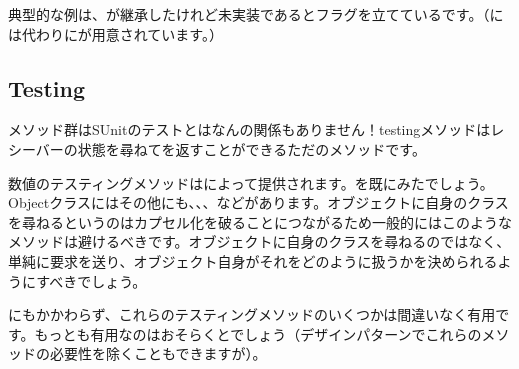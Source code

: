 \documentclass[a4paper,10pt,twoside]{book}
\begin{document}
典型的な例は、が継承したけれど未実装であるとフラグを立てているです。（には代わりにが用意されています。）



\subsection{Testing}

メソッド群はSUnitのテストとはなんの関係もありません！testingメソッドはレシーバーの状態を尋ねてを返すことができるただのメソッドです。

数値のテスティングメソッドはによって提供されます。を既にみたでしょう。Objectクラスにはその他にも、、、などがあります。オブジェクトに自身のクラスを尋ねるというのはカプセル化を破ることにつながるため一般的にはこのようなメソッドは避けるべきです。オブジェクトに自身のクラスを尋ねるのではなく、単純に要求を送り、オブジェクト自身がそれをどのように扱うかを決められるようにすべきでしょう。

にもかかわらず、これらのテスティングメソッドのいくつかは間違いなく有用です。もっとも有用なのはおそらくとでしょう（\cite{Wool98a}デザインパターンでこれらのメソッドの必要性を除くこともできますが）。
\end{document}
